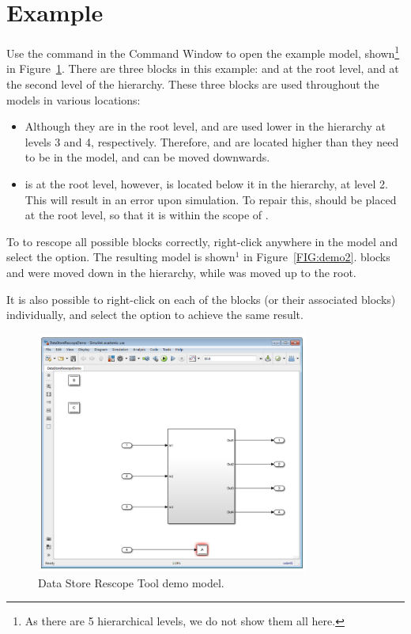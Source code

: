 \documentclass{article}
\makeatletter
\newcommand{\ToolName}{Data Store Rescope Tool\@\xspace}
\newcommand{\menu}[2]{%
	\ifthenelse{\equal{#1}{1}}{Rescope All}{}%
  	\ifthenelse{\equal{#1}{2}}{Rescope Selected}{}%
  	\ifthenelse{\equal{#1}{3}}{Rescope Non-Selected}{}%
}
\newcommand{\demoName}{\cmd{DataStoreRescopeDemo}\@\xspace}
\makeatother
\begin{document}
\clearpage
\section{Example}

Use the command \demoName in the \Simulink Command Window to open the example model, shown\footnote{As there are 5 hierarchical levels, we do not show them all here.} in Figure~\ref{FIG:demo1}. There are three \DSM blocks in this example:  and  at the root level, and  at the second level of the hierarchy. These three \DSM blocks are used throughout the models in various locations:

\begin{itemize}
	\item Although they are in the root level,  and  are used lower in the hierarchy at levels 3 and 4, respectively. Therefore, \DSM {} and  are located higher than they need to be in the model, and can be moved downwards.
	\item \DSW {} is at the root level, however, \DSM {} is located below it in the hierarchy, at level 2. This will result in an error upon simulation. To repair this, \DSM {} should be placed at the root level, so that it is within the scope of \DSW {}.
\end{itemize}

To to rescope all possible \DSM blocks correctly, right-click anywhere in the model and select the  option. The resulting model is shown$^1$ in Figure~\ref{FIG:demo2}. \DSM blocks  and  were moved down in the hierarchy, while  was moved up to the root.

It is also possible to right-click on each of the \DSM blocks (or their associated \DSRW blocks) individually, and select the  option to achieve the same result.

\begin{figure}
	\centering
	\includegraphics[width=0.8\textwidth]{../figs/Demo1}
	\caption{\ToolName demo model.}
	\label{FIG:demo1}
\end{figure}
\end{document}
